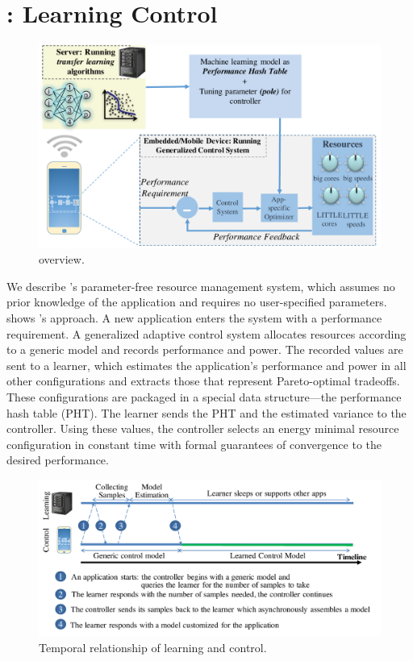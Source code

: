 \section{\SYSTEM{}: Learning Control}
\label{sec:framework}

\begin{figure}
  \includegraphics[width=\columnwidth]{figures/Overview.pdf}
  \caption{\SYSTEM{} overview.}
  \label{fig:overview}
\end{figure}


We describe \SYSTEM{}'s parameter-free resource management system,
which assumes no prior knowledge of the application and requires no
user-specified parameters.   shows \SYSTEM{}'s
approach.  A new application enters the system with a performance
requirement.  A generalized adaptive control system allocates
resources according to a generic model and records performance and
power.  The recorded values are sent to a learner, which estimates the
application's performance and power in all other configurations and
extracts those that represent Pareto-optimal tradeoffs.  These
configurations are packaged in a special data structure---the
performance hash table (PHT).  The learner sends the PHT and the
estimated variance to the controller.  Using these values, the
controller selects an energy minimal resource configuration in
constant time with formal guarantees of convergence to the desired
performance.

\begin{figure}
  \includegraphics[width=\columnwidth]{figures/Timeline.pdf}
  \caption{Temporal relationship of learning and control.}
  \label{fig:timeline}
\end{figure}

